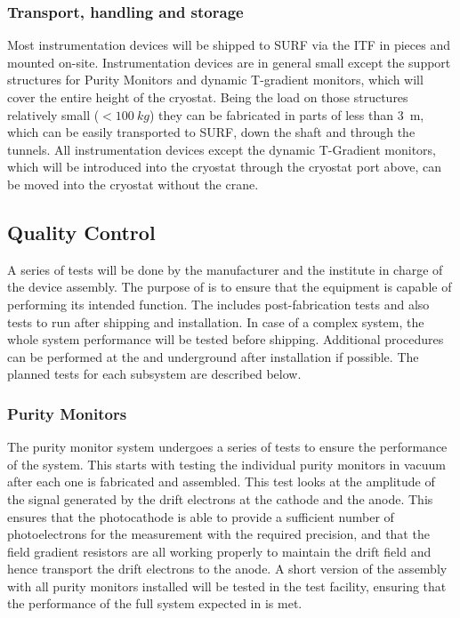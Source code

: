 \subsubsection{Transport, handling and storage}
\label{sec:fdgen-slow-cryo-install-transport}


Most instrumentation devices will be shipped to SURF via the ITF in pieces and mounted on-site. 
Instrumentation devices are in general small except the support structures for Purity Monitors and dynamic T-gradient monitors,
which will cover the entire height of the cryostat. Being the load on those structures relatively small (\(<\SI{100}{kg}\)) they can be fabricated in parts of less than \SI{3}{m},
which can be easily transported to SURF, down the shaft and through the tunnels.
All instrumentation devices except the dynamic T-Gradient monitors, which will be introduced into the cryostat through the cryostat port above, can be
moved into the cryostat without the crane.


\subsection{Quality Control}
\label{sec:fdsp-slow-cryo-qc}
A series of tests will be done by the manufacturer and the institute in charge of the device assembly. The purpose of   is to ensure that the equipment is capable of performing its intended function. The  includes post-fabrication tests and also tests to run after shipping and installation. In case of a complex system, the whole system performance will be tested before shipping. 
Additional  procedures can be performed at the  and underground after installation if possible. The planned tests for each subsystem are described below.  


\subsubsection{Purity Monitors}
\label{sec:fdgen-slow-cryo-qc-pm}

The purity monitor system undergoes a series of tests to ensure the performance of the system.  This  starts with testing the individual purity monitors in vacuum after each one is fabricated and assembled.  This test looks at the amplitude of the signal generated by the drift electrons at the cathode and the anode.  This ensures that the photocathode is able to provide a sufficient number of photoelectrons for the measurement %
with the required precision, and that the field gradient resistors are all working properly to maintain the drift field and hence transport the drift electrons to the anode.  A short version of the assembly with all purity monitors installed will be  tested in the \lar test facility, ensuring that the performance of the full system expected in \lar is met.  

